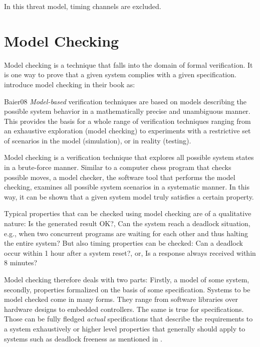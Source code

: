 In this threat model, timing channels are excluded.

\section{Model Checking}
\label{sec:model-checking}

Model checking is a technique that falls into the domain of formal verification.
It is one way to prove that a given system complies with a given specification.
\citeauthor{Baier08} introduce model checking in their book  \cite{Baier08} as:
\begin{displaycquote}[p.7ff.]{Baier08}
    \textit{Model-based} verification techniques are based on models describing the possible system behavior in a mathematically precise and unambiguous manner. \textelp{}
    This provides the basis for a whole range of verification techniques ranging from an exhaustive exploration (model checking) to experiments with a restrictive set of scenarios in the model (simulation), or in reality (testing). \textelp{}

    Model checking is a verification technique that explores all possible system states in a brute-force manner.
    Similar to a computer chess program that checks possible moves, a model checker, the software tool that performs the model checking, examines all possible system scenarios in a systematic manner.
    In this way, it can be shown that a given system model truly satisfies a certain property. \textelp{}

    Typical properties that can be checked using model checking are of a qualitative nature:
    Is the generated result OK?,
    Can the system reach a deadlock situation, e.g., when two concurrent programs are waiting for each other and thus halting the entire system?
    But also timing properties can be checked:
    Can a deadlock occur within 1 hour after a system reset?, or, Is a response always received within 8 minutes?
\end{displaycquote}

Model checking therefore deals with two parts: Firstly, a model of some system, secondly, properties formalized on the basis of some specification.
Systems to be model checked come in many forms.
They range from software libraries over hardware designs to embedded controllers.
The same is true for specifications.
Those can be fully fledged \textit{actual} specifications that describe the requirements to a system exhaustively or higher level properties that generally should apply to systems such as deadlock freeness as mentioned in \cite{Baier08}.

